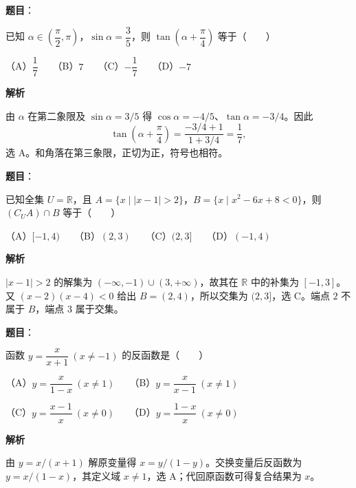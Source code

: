 \begin{answer}

\textbf{题目}：

已知 $\alpha\in\left(\dfrac{\pi}{2},\pi\right)$，$\sin\alpha=\dfrac35$，则 $\tan\left(\alpha+\dfrac{\pi}{4}\right)$ 等于\mbox{（　　）}

（A）$\dfrac17$　　（B）$7$　　（C）$-\dfrac17$　　（D）$-7$

\textbf{解析}

由 $\alpha$ 在第二象限及 $\sin\alpha=3/5$ 得 $\cos\alpha=-4/5$、$\tan\alpha=-3/4$。因此
\nopagebreak[4]
\[
\tan\left(\alpha+\frac\pi4\right)
=\frac{-3/4+1}{1+3/4}=\frac17,
\]
选 A。和角落在第三象限，正切为正，符号也相符。


\end{answer}
\begin{answer}

\textbf{题目}：

已知全集 $U=\mathbb R$，且 $A=\{x\mid |x-1|>2\}$，$B=\{x\mid x^2-6x+8<0\}$，则 $(C_U A)\cap B$ 等于\mbox{（　　）}

（A）$[-1,4)$　　（B）$(2,3)$　　（C）$(2,3]$　　（D）$(-1,4)$

\textbf{解析}

$|x-1|>2$ 的解集为 $(-\infty,-1)\cup(3,+\infty)$，故其在 $\mathbb R$ 中的补集为 $[-1,3]$。又 $(x-2)(x-4)<0$ 给出 $B=(2,4)$，所以交集为 $(2,3]$，选 C。端点 $2$ 不属于 $B$，端点 $3$ 属于交集。

\gkanswer{答案：C，$(2,3]$}

\end{answer}
\begin{answer}

\textbf{题目}：

函数 $y=\dfrac{x}{x+1}\ (x\ne-1)$ 的反函数是\mbox{（　　）}

（A）$y=\dfrac{x}{1-x}\ (x\ne1)$　　（B）$y=\dfrac{x}{x-1}\ (x\ne1)$

（C）$y=\dfrac{x-1}{x}\ (x\ne0)$　　（D）$y=\dfrac{1-x}{x}\ (x\ne0)$

\textbf{解析}

由 $y=x/(x+1)$ 解原变量得 $x=y/(1-y)$。交换变量后反函数为 $y=x/(1-x)$，其定义域 $x\ne1$，选 A；代回原函数可得复合结果为 $x$。


\end{answer}
